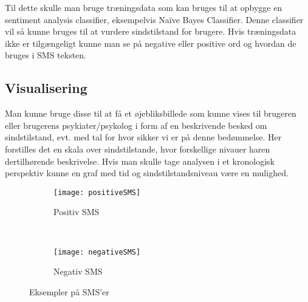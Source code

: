 Til dette skulle man bruge træningsdata som kan bruges til at opbygge en sentiment analysis classifier, eksempelvis Naïve Bayes Classifier. Denne classifier vil så kunne bruges til at vurdere sindstilstand for brugere. Hvis træningsdata ikke er tilgængeligt kunne man se på negative eller positive ord og hvordan de bruges i SMS teksten.

\subsection{Visualisering}
Man kunne bruge disse til at få et øjebliksbillede som kunne vises til brugeren eller brugerens psykiater/psykolog i form af en beskrivende besked om sindstilstand, evt. med tal for hvor sikker vi er på denne bedømmelse. Her forstilles det en skala over sindstilstande, hvor forskellige nivauer haren dertilhørende beskrivelse.
Hvis man skulle tage analysen i et kronologisk perspektiv kunne en graf med tid og sindstilstandsniveau være en mulighed. 

\begin{figure}
	\centering
	\begin{subfigure}[b]{0.3\textwidth}
		\texttt{[image: positiveSMS]}
		\caption{Positiv SMS}
	\end{subfigure}
	~
	\begin{subfigure}[b]{0.3\textwidth}
		\texttt{[image: negativeSMS]}
		\caption{Negativ SMS}
	\end{subfigure}
	\caption{Eksempler på SMS'er}
\end{figure}
	
	